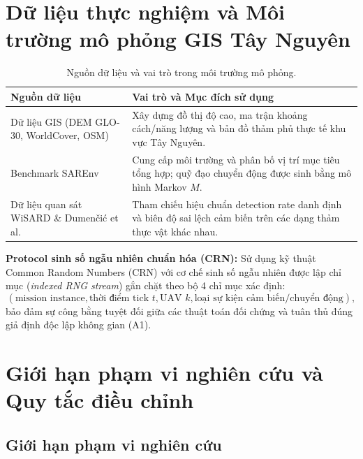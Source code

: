 \documentclass[12pt,a4paper]{article}
\begin{document}
\section{Dữ liệu thực nghiệm và Môi trường mô phỏng GIS Tây Nguyên}

\begin{table}[H]
\centering
\caption{Nguồn dữ liệu và vai trò trong môi trường mô phỏng.}
\label{tab:data}
\small
\begin{tabular}{@{}p{4.2cm}p{9.3cm}@{}}
\toprule
\textbf{Nguồn dữ liệu} & \textbf{Vai trò và Mục đích sử dụng} \\
\midrule
Dữ liệu GIS (DEM GLO-30, WorldCover, OSM) \cite{copdem, worldcover, osm} &
Xây dựng đồ thị độ cao, ma trận khoảng cách/năng lượng và bản đồ thảm phủ thực tế khu vực Tây Nguyên. \\
Benchmark SAREnv \cite{sarenv2025} &
Cung cấp môi trường và phân bố vị trí mục tiêu tổng hợp; quỹ đạo chuyển động được sinh bằng mô hình Markov $M$. \\
Dữ liệu quan sát WiSARD \cite{broyles2022} \& Dumenčić et al. \cite{dumencic2025} &
Tham chiếu hiệu chuẩn detection rate danh định và biên độ sai lệch cảm biến trên các dạng thảm thực vật khác nhau. \\
\bottomrule
\end{tabular}
\end{table}

\textbf{Protocol sinh số ngẫu nhiên chuẩn hóa (CRN):} Sử dụng kỹ thuật Common Random Numbers (CRN) với cơ chế sinh số ngẫu nhiên được lập chỉ mục (\emph{indexed RNG stream}) gắn chặt theo bộ 4 chỉ mục xác định:
\[
(\text{mission instance}, \text{thời điểm tick } t, \text{UAV } k, \text{loại sự kiện cảm biến/chuyển động}),
\]
bảo đảm sự công bằng tuyệt đối giữa các thuật toán đối chứng và tuân thủ đúng giả định độc lập không gian (A1).

\section{Giới hạn phạm vi nghiên cứu và Quy tắc điều chỉnh}

\subsection{Giới hạn phạm vi nghiên cứu}
\end{document}
